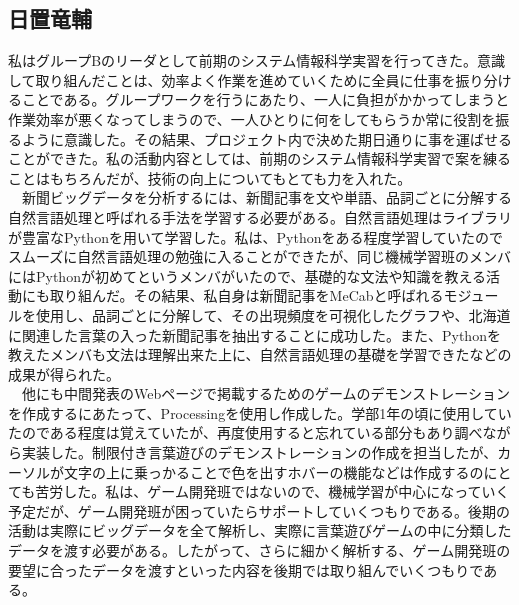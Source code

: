 \subsection{日置竜輔}
私はグループBのリーダとして前期のシステム情報科学実習を行ってきた。意識して取り組んだことは、効率よく作業を進めていくために全員に仕事を振り分けることである。グループワークを行うにあたり、一人に負担がかかってしまうと作業効率が悪くなってしまうので、一人ひとりに何をしてもらうか常に役割を振るように意識した。その結果、プロジェクト内で決めた期日通りに事を運ばせることができた。私の活動内容としては、前期のシステム情報科学実習で案を練ることはもちろんだが、技術の向上についてもとても力を入れた。\\
　新聞ビッグデータを分析するには、新聞記事を文や単語、品詞ごとに分解する自然言語処理と呼ばれる手法を学習する必要がある。自然言語処理はライブラリが豊富なPythonを用いて学習した。私は、Pythonをある程度学習していたのでスムーズに自然言語処理の勉強に入ることができたが、同じ機械学習班のメンバにはPythonが初めてというメンバがいたので、基礎的な文法や知識を教える活動にも取り組んだ。その結果、私自身は新聞記事をMeCabと呼ばれるモジュールを使用し、品詞ごとに分解して、その出現頻度を可視化したグラフや、北海道に関連した言葉の入った新聞記事を抽出することに成功した。また、Pythonを教えたメンバも文法は理解出来た上に、自然言語処理の基礎を学習できたなどの成果が得られた。\\
　他にも中間発表のWebページで掲載するためのゲームのデモンストレーションを作成するにあたって、Processingを使用し作成した。学部1年の頃に使用していたのである程度は覚えていたが、再度使用すると忘れている部分もあり調べながら実装した。制限付き言葉遊びのデモンストレーションの作成を担当したが、カーソルが文字の上に乗っかることで色を出すホバーの機能などは作成するのにとても苦労した。私は、ゲーム開発班ではないので、機械学習が中心になっていく予定だが、ゲーム開発班が困っていたらサポートしていくつもりである。後期の活動は実際にビッグデータを全て解析し、実際に言葉遊びゲームの中に分類したデータを渡す必要がある。したがって、さらに細かく解析する、ゲーム開発班の要望に合ったデータを渡すといった内容を後期では取り組んでいくつもりである。

